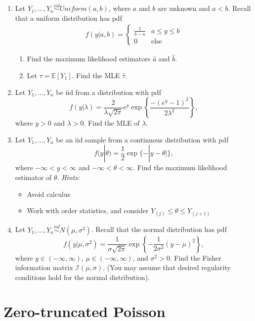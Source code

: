 \documentclass[11pt]{article}
\begin{document}
\begin{enumerate}
\item Let $Y_1,...,Y_n \overset{iid}{\sim} Uniform(a, b)$, where $a$ and $b$ are unknown and $a < b$. Recall that a uniform distribution has pdf
\begin{align*}
f(y|a,b) = \begin{cases}
\frac{1}{b - a} & a \leq y \leq b \\
0 & \text{else}
\end{cases}
\end{align*}
\begin{enumerate}
\item Find the maximum likelihood estimators $\widehat{a}$ and $\widehat{b}$.
\item Let $\tau = \mathbb{E}[Y_1]$. Find the MLE $\widehat{\tau}$.
\end{enumerate}

\item Let $Y_1,...,Y_n$ be iid from a distribution with pdf
$$f(y|\lambda) = \frac{2}{\lambda \sqrt{2 \pi}} e^y \exp \left\lbrace \frac{-(e^y - 1)^2}{2\lambda^2} \right\rbrace,$$
where $y > 0$ and $\lambda > 0$. Find the MLE of $\lambda$.

\item Let $Y_1,...,Y_n$ be an iid sample from a continuous distribution with pdf 
$$f(y|\theta) = \frac{1}{2} \exp\{-|y - \theta|\},$$
where $-\infty < y < \infty$ and $-\infty < \theta < \infty$. Find the maximum likelihood estimator of $\theta$. \textit{Hints:}
\begin{itemize}
\item Avoid calculus
\item Work with order statistics, and consider $Y_{(j)} \leq \theta \leq Y_{(j+1)}$
\end{itemize}

\item Let $Y_1,...,Y_n \overset{iid}{\sim} N(\mu, \sigma^2)$. Recall that the normal distribution has pdf
$$f(y|\mu, \sigma^2) = \dfrac{1}{\sigma \sqrt{2 \pi}} \exp \left\lbrace -\frac{1}{2\sigma^2}(y - \mu)^2 \right\rbrace,$$
where $y \in (-\infty, \infty)$, $\mu \in (-\infty, \infty)$, and $\sigma^2 > 0$. Find the Fisher information matrix $\mathcal{I}(\mu, \sigma)$. (You may assume that desired regularity conditions hold for the normal distribution).

\end{enumerate}

\newpage

\section*{Zero-truncated Poisson}
\end{document}
